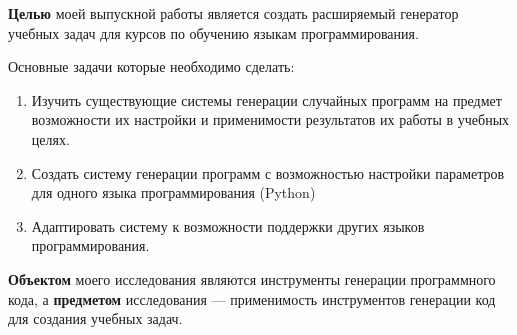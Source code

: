 \textbf{Целью} моей выпускной работы является
создать расширяемый генератор учебных задач для курсов по обучению языкам программирования.

Основные задачи которые необходимо сделать:
\begin{enumerate}[label=\alph*.]
    \item Изучить существующие системы генерации случайных программ на предмет возможности их
          настройки и применимости результатов их работы в учебных целях.
    \item Создать систему
          генерации программ с возможностью настройки параметров для одного языка программирования (Python)
    \item Адаптировать систему к возможности поддержки других языков программирования.
\end{enumerate}

\textbf{Объектом} моего исследования являются инструменты генерации программного кода, а
\textbf{предметом} исследования --- применимость инструментов генерации код для создания учебных задач.